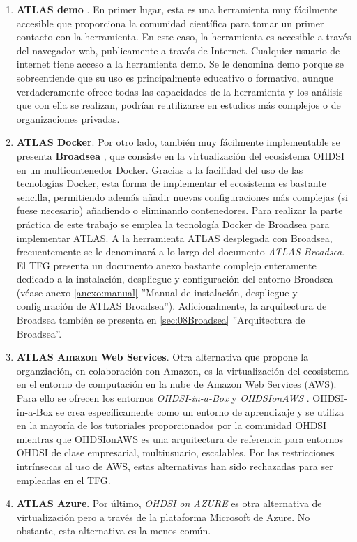 \begin{enumerate}[label=\alph*.]

    \item \textbf{ATLAS demo} \parencite{ATLASdemo}. En primer lugar, esta es una herramienta muy fácilmente accesible que proporciona la comunidad científica para tomar un primer contacto con la herramienta. En este caso, la herramienta es accesible a través del navegador web, publicamente a través de Internet. Cualquier usuario de internet tiene acceso a la herramienta demo. Se le denomina demo porque se sobreentiende que su uso es principalmente educativo o formativo, aunque verdaderamente ofrece todas las capacidades de la herramienta y los análisis que con ella se realizan, podrían reutilizarse en estudios más complejos o de organizaciones privadas.

    \item \textbf{ATLAS Docker}. Por otro lado, también muy fácilmente implementable se presenta \textbf{Broadsea} \parencite{githubBroadsea}, que consiste en la virtualización del ecosistema OHDSI en un multicontenedor Docker. Gracias a la facilidad del uso de las tecnologías Docker, esta forma de implementar el ecosistema es bastante sencilla, permitiendo además añadir nuevas configuraciones más complejas (si fuese necesario) añadiendo o eliminando contenedores. Para realizar la parte práctica de este trabajo se emplea la tecnología Docker de Broadsea para implementar ATLAS. A la herramienta ATLAS desplegada con Broadsea, frecuentemente se le denominará a lo largo del documento \textit{ATLAS Broadsea}. El TFG presenta un documento anexo bastante complejo enteramente dedicado a la instalación, despliegue y configuración del entorno Broadsea (véase anexo \ref{anexo:manual} ''Manual de instalación, despliegue y configuración de ATLAS Broadsea''). Adicionalmente, la arquitectura de Broadsea también se presenta en \ref{sec:08Broadsea} ''Arquitectura de Broadsea''.

    \item \textbf{ATLAS Amazon Web Services}. Otra alternativa que propone la organziación, en colaboración con Amazon, es la virtualización del ecosistema en el entorno de computación en la nube de Amazon Web Services (AWS). Para ello se ofrecen los entornos \textit{OHDSI-in-a-Box} \parencite{githubOHDSIBox} y \textit{OHDSIonAWS} \parencite{githubOHDSIAWS}. OHDSI-in-a-Box se crea específicamente como un entorno de aprendizaje y se utiliza en la mayoría de los tutoriales proporcionados por la comunidad OHDSI mientras que OHDSIonAWS es una arquitectura de referencia para entornos OHDSI de clase empresarial, multiusuario, escalables. Por las restricciones intrínsecas al uso de AWS, estas alternativas han sido rechazadas para ser empleadas en el TFG.
    
    \item \textbf{ATLAS Azure}. Por último, \textit{OHDSI on AZURE} \parencite{OHDSIonAzure} es otra alternativa de virtualización pero a través de la plataforma Microsoft de Azure. No obstante, esta alternativa es la menos común.
    
\end{enumerate}

